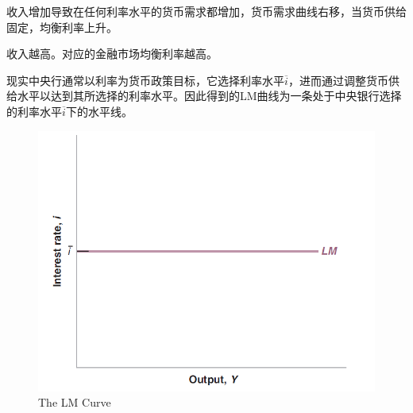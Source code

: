 \documentclass{article}
\begin{document}
收入增加导致在任何利率水平的货币需求都增加，货币需求曲线右移，当货币供给固定，均衡利率上升。

收入越高。对应的金融市场均衡利率越高。

\hspace*{\fill}

现实中央行通常以利率为货币政策目标，它选择利率水平$ \overline{i} $，进而通过调整货币供给水平以达到其所选择的利率水平。因此得到的LM曲线为一条处于中央银行选择的利率水平$ \overline{i} $下的水平线。

\begin{figure}[H] %
	\centering %
	\includegraphics[width=1\textwidth]{5_3} %
	\caption{The LM Curve} %
	\label{Fig.main4} %
\end{figure}


\end{document}
